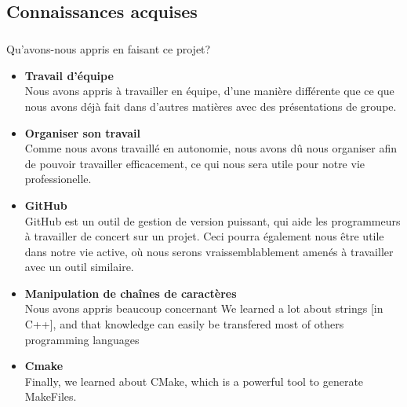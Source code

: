\documentclass[12pt,a4paper,twoside]{article}
\begin{document}
		\subsection{Connaissances acquises} %
			\subparagraph*{}
				Qu'avons-nous appris en faisant ce projet?
				\begin{itemize}
					\item{} \textbf{Travail d'équipe}\\
						Nous avons appris à travailler en équipe, d'une manière différente que ce que nous avons déjà fait dans d'autres matières avec des présentations de groupe.
					\item{} \textbf{Organiser son travail}\\
						Comme nous avons travaillé en autonomie, nous avons dû nous organiser afin de pouvoir travailler efficacement, ce qui nous sera utile pour notre vie professionelle.
					\item{} \textbf{GitHub}\\
						GitHub est un outil de gestion de version puissant, qui aide les programmeurs à travailler de concert sur un projet. Ceci pourra également nous être utile dans notre vie active, où nous serons vraissemblablement amenés à travailler avec un outil similaire.
					\item{} \textbf{Manipulation de chaînes de caractères}\\
						Nous avons appris beaucoup concernant 
						We learned a lot about strings [in C++], and that knowledge can easily be transfered most of others programming languages
					\item{} \textbf{Cmake}\\
						Finally, we learned about CMake, which is a powerful tool to generate MakeFiles.
				\end{itemize}
\end{document}
